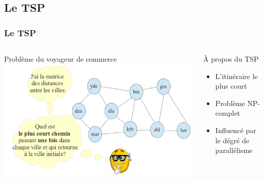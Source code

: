 \documentclass[10pt]{beamer}
\begin{document}
\subsection{Le TSP}
\begin{frame}
\frametitle{Le TSP}
  \begin{columns}[T]
    \begin{column}{.55\textwidth}
    \begin{block}{Problème du voyageur de commerce}
    \includegraphics[scale=0.32]{figures/TSP_problem.png}
    \end{block}
    \end{column}
    \begin{column}{.4\textwidth}
     \begin{block}{À propos du TSP}
      \begin{itemize}
       \item L'itinéraire le plus court
       \item Problème NP-complet
       \item Influencé par le dégré de parallélisme
      \end{itemize}
     \end{block}
    \end{column}
  \end{columns}
\end{frame}
\end{document}
